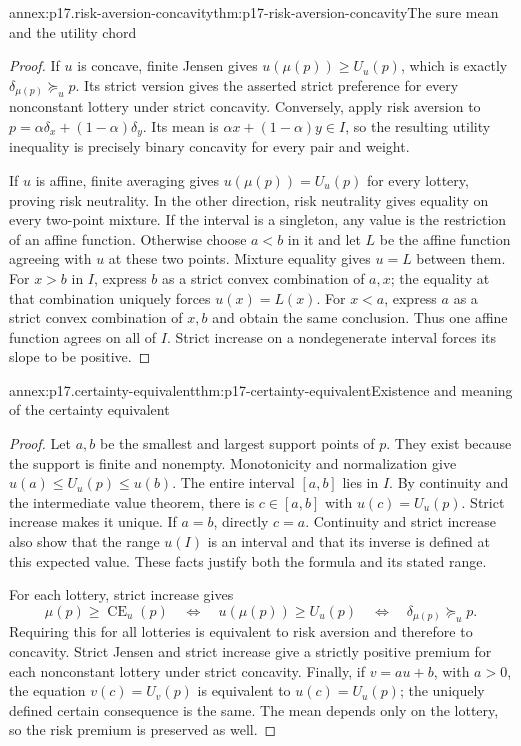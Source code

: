 \begin{annexitem}{annex:p17.risk-aversion-concavity}{thm:p17-risk-aversion-concavity}{The sure mean and the utility chord}
\begin{proof}
If \(u\) is concave, finite Jensen gives
\(u(\mu(p))\geq U_u(p)\), which is exactly
\(\delta_{\mu(p)}\succeq_u p\). Its strict version gives the
asserted strict preference for every nonconstant lottery under
strict concavity.
Conversely, apply risk aversion to
\(p=\alpha\delta_x+(1-\alpha)\delta_y\). Its mean is
\(\alpha x+(1-\alpha)y\in I\), so the resulting utility inequality
is precisely binary concavity for every pair and weight.

If \(u\) is affine, finite averaging gives
\(u(\mu(p))=U_u(p)\) for every lottery, proving risk neutrality.
In the other direction, risk neutrality gives equality on every
two-point mixture. If the interval is a singleton, any value is the
restriction of an affine function. Otherwise choose \(a<b\) in it
and let \(L\) be the affine function agreeing with \(u\) at these
two points. Mixture equality gives \(u=L\) between them. For
\(x>b\) in \(I\), express \(b\) as a strict convex combination
of \(a,x\); the equality at that combination uniquely forces
\(u(x)=L(x)\). For \(x<a\), express \(a\) as a strict convex
combination of \(x,b\) and obtain the same conclusion. Thus one
affine function agrees on all of \(I\). Strict increase on a
nondegenerate interval forces its slope to be positive.
\end{proof}
\end{annexitem}

\begin{annexitem}{annex:p17.certainty-equivalent}{thm:p17-certainty-equivalent}{Existence and meaning of the certainty equivalent}
\begin{proof}
Let \(a,b\) be the smallest and largest support points of \(p\).
They exist because the support is finite and nonempty. Monotonicity
and normalization give
\(u(a)\leq U_u(p)\leq u(b)\). The entire interval \([a,b]\)
lies in \(I\). By continuity and the intermediate value theorem,
there is \(c\in[a,b]\) with \(u(c)=U_u(p)\). Strict increase
makes it unique. If \(a=b\), directly \(c=a\). Continuity and
strict increase also show that the range \(u(I)\) is an interval
and that its inverse is defined at this expected value. These facts
justify both the formula and its stated range.

For each lottery, strict increase gives
\[
 \mu(p)\geq\operatorname{CE}_u(p)
 \quad\Longleftrightarrow\quad
 u(\mu(p))\geq U_u(p)
 \quad\Longleftrightarrow\quad
 \delta_{\mu(p)}\succeq_u p.
\]
Requiring this for all lotteries is equivalent to risk aversion and
therefore to concavity. Strict Jensen and strict increase give a
strictly positive premium for each nonconstant lottery under strict
concavity. Finally, if \(v=a u+b\), with \(a>0\), the equation
\(v(c)=U_v(p)\) is equivalent to \(u(c)=U_u(p)\); the uniquely
defined certain consequence is the same. The mean depends only on
the lottery, so the risk premium is preserved as well.
\end{proof}
\end{annexitem}

